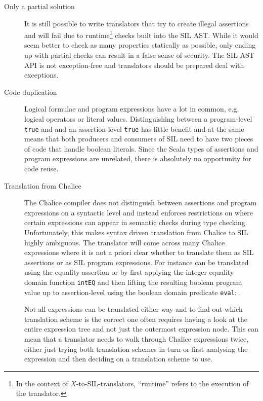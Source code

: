 \begin{description}
\item[Only a partial solution] It is still possible to write translators that try to create illegal assertions and will fail due to runtime\footnote{In the context of $X$-to-SIL-translators, ``runtime'' refers to the execution of the translator.} checks built into the SIL AST.
While it would seem better to check as many properties statically as possible, only ending up with partial checks can result in a false sense of security. 
The SIL AST API is not exception-free and translators should be prepared deal with exceptions.
\item[Code duplication] Logical formulae and program expressions have a lot in common, e.g. logical operators or literal values. 
Distinguishing between a program-level \lstinline[language=Chalice]!true! and and an assertion-level \lstinline[language=Chalice]!true! has little benefit and at the same means that both producers and consumers of SIL need to have two pieces of code that handle boolean literals.
Since the Scala types of assertions and program expressions are unrelated, there is absolutely no opportunity for code reuse.
\item[Translation from Chalice] The Chalice compiler does not distinguish between assertions and program expressions on a syntactic level and instead enforces restrictions on where certain expressions can appear in semantic checks during type checking. 
Unfortunately, this makes syntax driven translation from Chalice to SIL highly ambiguous. 
The translator will come across many Chalice expressions where it is not a priori clear whether to translate them as SIL assertions or as SIL program expressions. 
For instance  can be translated using the equality assertion  or by first applying the integer equality domain function \lstinline!intEQ! and then lifting the resulting boolean program value up to assertion-level using the boolean domain predicate \lstinline!eval!: .

Not all expressions can be translated either way and to find out which translation scheme is the correct one often requires having a look at the entire expression tree and not just the outermost expression node. 
This can mean that a translator needs to walk through Chalice expressions twice, either just trying both translation schemes in turn or first analysing the expression and then deciding on a translation scheme to use.


\end{description}
